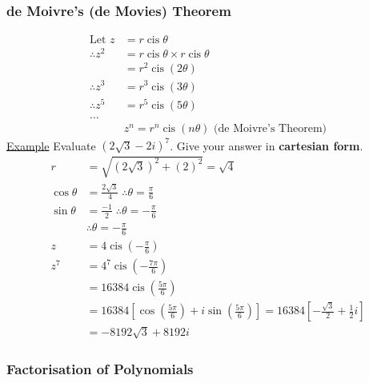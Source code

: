 \documentclass[a4paper]{article}
\DeclareMathOperator\cis{cis}
\begin{document}
			\subsubsection{de Moivre's (de Movies) Theorem}
				\begin{align*}
					\text{Let }z&=r\cis\theta \\
					\therefore z^2&=r\cis\theta\times r\cis\theta \\
					&=r^2\cis(2\theta) \\
					\therefore z^3&=r^3\cis(3\theta) \\
					\therefore z^5&=r^5\cis(5\theta) \\
					\ldots
					\\
					&z^n=r^n\cis(n\theta)\text{ (de Moivre's Theorem)}
				\end{align*}
				\underline{Example}\newline
				Evaluate $(2\sqrt{3}-2i)^7$. Give your answer in \textbf{cartesian form}.
				\begin{align*}
					r&=\sqrt{(2\sqrt{3})^2+(2)^2}=\sqrt{4} \\
					\cos\theta&=\frac{2\sqrt{3}}{4}\;\therefore\theta=\frac{\pi}{6} \\
					\sin\theta&=\frac{-1}{2}\;\therefore\theta=-\frac{\pi}{6} \\
					&\therefore\theta=-\frac{\pi}{6} \\
					z&=4\cis\left(-\frac{\pi}{6}\right) \\
					z^7&=4^7\cis\left(-\frac{7\pi}{6}\right) \\
					&=16384\cis\left(\frac{5\pi}{6}\right) \\
					&=16384\left[\cos\left(\frac{5\pi}{6}\right)+i\sin\left(\frac{5\pi}{6}\right)\right]=16384\left[-\frac{\sqrt{3}}{2}+\frac{1}{2}i\right] \\
					&=-8192\sqrt{3}+8192i
				\end{align*}
			\subsubsection{Factorisation of Polynomials}
\end{document}
